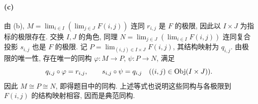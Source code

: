 \documentclass{article}
\begin{document}
\begin{solution}
\begin{center}
	\end{center}

	\paragraph{(c)} 由 (b), $M = \lim_{i\in I}(\lim_{j\in J}F(i,j))$ 连同 $r_{i,j}$ 是 $F$ 的极限, 因此以 $I\times J$ 为指标的极限存在. 交换 $I,J$ 的角色, 同理 $N = \lim_{j\in J}(\lim_{i\in I}F(i,j))$ 连同复合投影 $s_{i,j}$ 也是 $F$ 的极限. 记 $P = \lim_{(i,j)\in I\times J}F(i,j)$, 其结构映射为 $q_{i,j}$. 由极限的唯一性, 存在唯一的同构 $\varphi: M \to P$, $\psi: P \to N$, 满足
	\[ q_{i,j} \circ \varphi = r_{i,j}, \qquad s_{i,j} \circ \psi = q_{i,j} \quad ((i,j)\in\operatorname{Obj}(I\times J)). \]
	因此 $M \cong P \cong N$, 即得题目中的同构. 上述等式也说明这些同构与各极限到 $F(i,j)$ 的结构映射相容, 因而是典范同构.
\end{solution}
\end{document}
